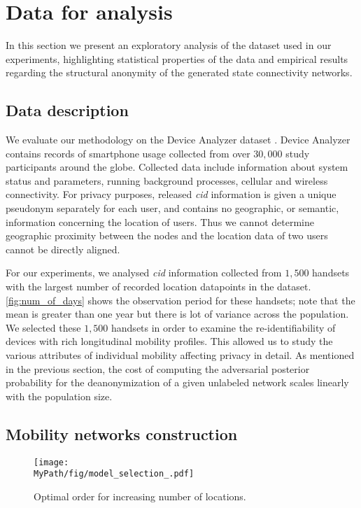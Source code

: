 \section{Data for analysis}

In this section we present an exploratory analysis of the dataset used in our experiments, highlighting statistical properties of the data and empirical results regarding the structural anonymity of the generated state connectivity networks.

\subsection{Data description}

We evaluate our methodology on the Device Analyzer dataset \cite{Wagner2014}. Device Analyzer contains records of smartphone usage collected from over $ 30,000 $  study participants around the globe.
Collected data include information about system status and parameters, running background processes, cellular and wireless connectivity.
For privacy purposes, released \emph{cid} information is given a unique pseudonym separately for each user, and contains no geographic, or semantic, information concerning the location of users.
Thus we cannot determine geographic proximity between the nodes and the location data of two users cannot be directly aligned.

For our experiments, we analysed \emph{cid} information collected from $1,500$ handsets with the largest number of recorded location datapoints in the dataset.
\cref{fig:num_of_days} shows the observation period for these handsets; note that the mean is greater than one year but there is lot of variance across the population.
We selected these $1,500$ handsets in order to examine the re-identifiability of devices with rich longitudinal mobility profiles.
This allowed us to study the various attributes of individual mobility affecting privacy in detail.
As mentioned in the previous section, the cost of computing the adversarial posterior probability for the deanonymization of a given unlabeled network scales linearly with the population size.

\subsection{Mobility networks construction\label{sec:mobility-net-construct}}

\begin{figure*}[t]
	\centering
	\texttt{[image: \\MyPath/fig/model\_selection\_.pdf]}
	\caption{{Optimal order for increasing number of locations.}}
	\label{fig:model_selection}
\end{figure*}

